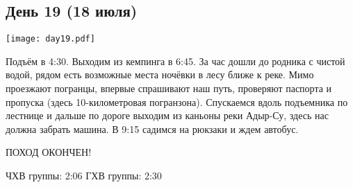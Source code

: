\graphicspath{{Pictures/Chapter5/Day19}}



\subsection{День 19 (18 июля)}\label{subsec:Day19}
    \parbox[c]{\textwidth}{%
        \texttt{[image: day19.pdf]}\label{fig:Day19_map}%
    }
    \vspace{0.8cm}

Подъём в 4:30. Выходим из кемпинга в 6:45. За час дошли до родника с чистой водой, рядом есть возможные места ночёвки в лесу ближе к реке. Мимо проезжают погранцы, впервые спрашивают наш путь, проверяют паспорта и пропуска (здесь 10-километровая погранзона). Спускаемся вдоль подъемника по лестнице и дальше по дороге выходим из каньоны реки Адыр-Су, здесь нас должна забрать машина. В 9:15 садимся на рюкзаки и ждем автобус.

ПОХОД ОКОНЧЕН!








ЧХВ группы: 2:06
ГХВ группы: 2:30

    \FloatBarrier
